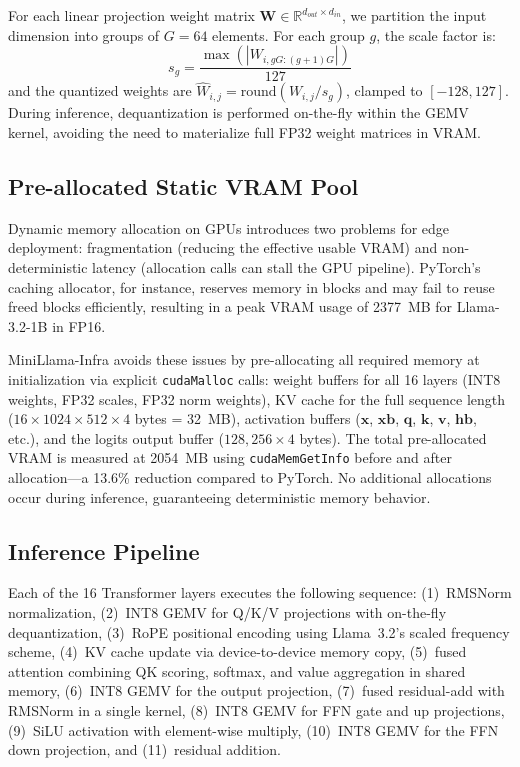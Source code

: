 \documentclass[conference]{IEEEtran}
\begin{document}
For each linear projection weight matrix $\mathbf{W} \in \mathbb{R}^{d_{out} \times d_{in}}$, we partition the input dimension into groups of $G=64$ elements. For each group $g$, the scale factor is:
\begin{equation}
    s_g = \frac{\max(|W_{i, gG:(g+1)G}|)}{127}
\end{equation}
and the quantized weights are $\hat{W}_{i,j} = \text{round}(W_{i,j} / s_g)$, clamped to $[-128, 127]$. During inference, dequantization is performed on-the-fly within the GEMV kernel, avoiding the need to materialize full FP32 weight matrices in VRAM.

\subsection{Pre-allocated Static VRAM Pool}
Dynamic memory allocation on GPUs introduces two problems for edge deployment: fragmentation (reducing the effective usable VRAM) and non-deterministic latency (allocation calls can stall the GPU pipeline). PyTorch's caching allocator, for instance, reserves memory in blocks and may fail to reuse freed blocks efficiently, resulting in a peak VRAM usage of 2377~MB for Llama-3.2-1B in FP16.

MiniLlama-Infra avoids these issues by pre-allocating all required memory at initialization via explicit \texttt{cudaMalloc} calls: weight buffers for all 16 layers (INT8 weights, FP32 scales, FP32 norm weights), KV cache for the full sequence length ($16 \times 1024 \times 512 \times 4$ bytes = 32~MB), activation buffers ($\mathbf{x}$, $\mathbf{xb}$, $\mathbf{q}$, $\mathbf{k}$, $\mathbf{v}$, $\mathbf{hb}$, etc.), and the logits output buffer ($128{,}256 \times 4$ bytes). The total pre-allocated VRAM is measured at 2054~MB using \texttt{cudaMemGetInfo} before and after allocation---a 13.6\% reduction compared to PyTorch. No additional allocations occur during inference, guaranteeing deterministic memory behavior.

\subsection{Inference Pipeline}
Each of the 16 Transformer layers executes the following sequence: (1)~RMSNorm normalization, (2)~INT8 GEMV for Q/K/V projections with on-the-fly dequantization, (3)~RoPE positional encoding using Llama~3.2's scaled frequency scheme, (4)~KV cache update via device-to-device memory copy, (5)~fused attention combining QK scoring, softmax, and value aggregation in shared memory, (6)~INT8 GEMV for the output projection, (7)~fused residual-add with RMSNorm in a single kernel, (8)~INT8 GEMV for FFN gate and up projections, (9)~SiLU activation with element-wise multiply, (10)~INT8 GEMV for the FFN down projection, and (11)~residual addition.
\end{document}
